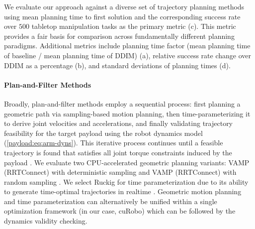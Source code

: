 We evaluate our approach against a diverse set of trajectory planning methods using mean planning time to first solution and the corresponding success rate over $500$ tabletop manipulation tasks as the primary metric (c). This metric provides a fair basis for comparison across fundamentally different planning paradigms. Additional metrics include planning time factor (mean planning time of baseline / mean planning time of DDIM) (a), relative success rate change over DDIM as a percentage (b), and standard deviations of planning times (d).

\paragraph{Plan-and-Filter Methods}

Broadly, plan-and-filter methods employ a sequential process: first planning a geometric path via sampling-based motion planning, then time-parameterizing it to derive joint velocities and accelerations, and finally validating trajectory feasibility for the target payload using the robot dynamics model (\cref{payload:eq:arm-dyns}).
This iterative process continues until a feasible trajectory is found that satisfies all joint torque constraints induced by the payload \cite{abderezaei2024clutter}.
We evaluate two CPU-accelerated geometric planning variants: VAMP (RRTConnect) with deterministic sampling and VAMP (RRTConnect) with random sampling \cite{thomason2024motions}. We select Ruckig for time parameterization due to its ability to generate time-optimal trajectories in realtime \cite{berscheid2021jerk}.
Geometric motion planning and time parameterization can alternatively be unified within a single optimization framework (in our case, cuRobo) which can be followed by the dynamics validity checking.

